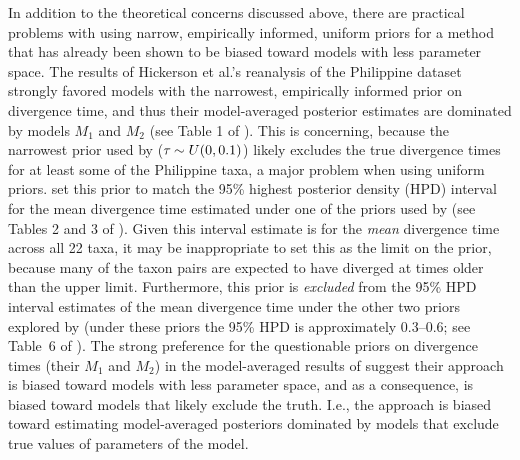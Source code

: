 \documentclass[letterpaper,12pt]{article}
\begin{document}
\begin{linenumbers}
In addition to the theoretical concerns discussed above, there are practical
problems with using narrow, empirically informed, uniform priors for a method
that has already been shown to be biased toward models with less parameter
space.
The results of Hickerson et al.'s \citeyear{Hickerson2013} reanalysis of the
Philippine dataset strongly favored models with the narrowest, empirically
informed prior on divergence time, and thus their model-averaged posterior
estimates are dominated by models $M_1$ and $M_2$ (see Table 1 of
\citet{Hickerson2013}).
This is concerning, because the narrowest \divt{} prior used by
\citet{Hickerson2013} ($\tau_{} \sim U(0,0.1)$) likely excludes the true
divergence times for at least some of the Philippine taxa, a major problem when
using uniform priors.
\citet{Hickerson2013} set this prior to match the 95\% highest posterior
density (HPD) interval for the mean divergence time estimated under one of the
priors used by \citet{Oaks2012} (see Tables 2 and 3 of \citet{Oaks2012}).
Given this interval estimate is for the \emph{mean} divergence time across all
22 taxa, it may be inappropriate to set this as the limit on the prior, because
many of the taxon pairs are expected to have diverged at times older than the
upper limit.
Furthermore, this prior is \emph{excluded} from the 95\% HPD interval estimates
of the mean divergence time under the other two priors explored by
\citet{Oaks2012} (under these priors the 95\% HPD is approximately 0.3--0.6;
see Table~6 of \citet{Oaks2012}).
The strong preference for the questionable priors on divergence times (their
$M_1$ and $M_2$) in the model-averaged results of \citet{Hickerson2013} suggest
their approach is biased toward models with less parameter space, and as a
consequence, is biased toward models that likely exclude the truth.
I.e., the approach is biased toward estimating model-averaged posteriors
dominated by models that exclude true values of parameters of the model.



\end{linenumbers}
\end{document}
